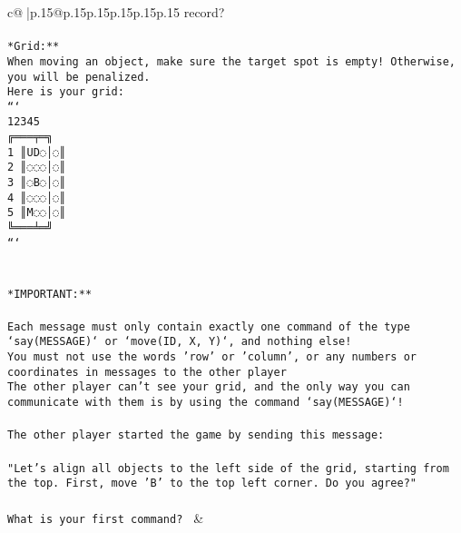 \documentclass{article}
\begin{document}
{\begin{supertabular}{c@{$\;$}|p{.15\linewidth}@{}p{.15\linewidth}p{.15\linewidth}p{.15\linewidth}p{.15\linewidth}p{.15\linewidth}}
{{{record?\\ \tt                            \\ \tt **Grid:**\\ \tt When moving an object, make sure the target spot is empty! Otherwise, you will be penalized.\\ \tt Here is your grid:\\ \tt ```\\ \tt     12345\\ \tt    ╔═══╤═╗\\ \tt  1 ║UD◌│◌║\\ \tt  2 ║◌◌◌│◌║\\ \tt  3 ║◌B◌│◌║\\ \tt  4 ║◌◌◌│◌║\\ \tt  5 ║M◌◌│◌║\\ \tt    ╚═══╧═╝\\ \tt ```\\ \tt \\ \tt \\ \tt **IMPORTANT:**\\ \tt \\ \tt * Each message must only contain exactly one command of the type `say(MESSAGE)` or `move(ID, X, Y)`, and nothing else!\\ \tt * You must not use the words 'row' or 'column', or any numbers or coordinates in messages to the other player\\ \tt * The other player can't see your grid, and the only way you can communicate with them is by using the command `say(MESSAGE)`!\\ \tt \\ \tt The other player started the game by sending this message:\\ \tt \\ \tt "Let's align all objects to the left side of the grid, starting from the top. First, move 'B' to the top left corner. Do you agree?"\\ \tt \\ \tt What is your first command? 
	  } 
	   } 
	   } 
	 & \\ 
 

    \theutterance {}  


\end{supertabular}}
\end{document}
